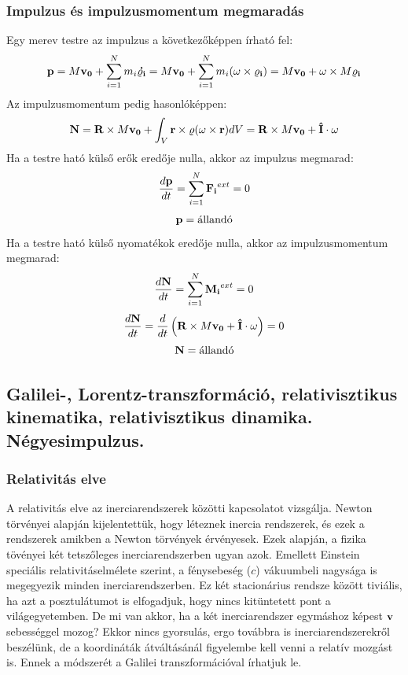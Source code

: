 \documentclass[a4paper,12pt]{article}
\begin{document}
\subsubsection*{Impulzus és impulzusmomentum megmaradás}
Egy merev testre az impulzus a következőképpen írható fel:
\begin{equation}
    \bold{p} = M \bold{v_0} + \sum_{i=1}^{N} m_i \bold{\dot{\varrho_i}} = M \bold{v_0} + \sum_{i=1}^{N} m_i (\bold{\omega} \times \bold{\varrho_i}) = M \bold{v_0} + \bold{\omega} \times M \bold{\varrho_i}
\end{equation}
Az impulzusmomentum pedig hasonlóképpen:
\begin{equation}
    \bold{N} = \bold{R} \times M \bold{v_0} + \int_{V} \bold{r} \times \varrho (\bold{\omega} \times \bold{r}) dV = \bold{R} \times M \bold{v_0} + \bold{\hat{I}} \cdot \bold{\omega}
\end{equation}
Ha a testre ható külső erők eredője nulla, akkor az impulzus megmarad:
\begin{equation}
    \frac{d\bold{p}}{dt} = \sum_{i=1}^{N} \bold{F_i}^{ext} = 0
\end{equation}
\begin{equation}
    \bold{p} = \text{állandó}
\end{equation}
Ha a testre ható külső nyomatékok eredője nulla, akkor az impulzusmomentum megmarad:
\begin{equation}
    \frac{d\bold{N}}{dt} = \sum_{i=1}^{N} \bold{M_i}^{ext} = 0
\end{equation}
\begin{equation}
    \frac{d\bold{N}}{dt} = \frac{d}{dt} \left(\bold{R} \times M \bold{v_0} + \bold{\hat{I}} \cdot \bold{\omega}\right) = 0
\end{equation}
\begin{equation}
    \bold{N} = \text{állandó}
\end{equation}  

\subsection{Galilei-, Lorentz-transzformáció, relativisztikus kinematika, relativisztikus dinamika. Négyesimpulzus.}

\subsubsection{Relativitás elve}
 A relativitás elve az inerciarendszerek közötti kapcsolatot vizsgálja. Newton törvényei alapján kijelentettük, hogy léteznek inercia rendszerek, és ezek a rendszerek amikben a 
 Newton törvények érvényesek. Ezek alapján, a fizika tövényei két tetszőleges inerciarendszerben ugyan azok. Emellett Einstein speciális relativitáselmélete szerint, a fénysebeség ($c$)
 vákuumbeli nagysága is megegyezik minden inerciarendszerben. Ez két stacionárius rendsze között tiviális, ha azt a posztulátumot is elfogadjuk, hogy nincs kitüntetett pont a világegyetemben.
 De mi van akkor, ha a két inerciarendszer egymáshoz képest $\bold{v}$ sebességgel mozog? Ekkor nincs gyorsulás, ergo továbbra is inerciarendszerekről beszélünk, de a koordináták átváltásánál figyelembe kell venni a relatív mozgást is.
 Ennek a módszerét a Galilei transzformációval írhatjuk le.
\end{document}
